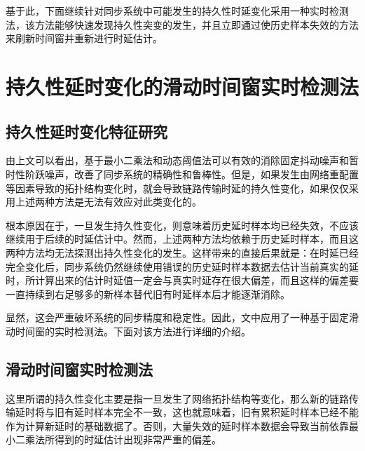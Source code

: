 基于此，下面继续针对同步系统中可能发生的持久性时延变化采用一种实时检测法，该方法能够快速发现持久性突变的发生，并且立即通过使历史样本失效的方法来刷新时间窗并重新进行时延估计。

\section{持久性延时变化的滑动时间窗实时检测法}
\subsection{持久性延时变化特征研究}
由上文可以看出，基于最小二乘法和动态阈值法可以有效的消除固定抖动噪声和暂时性阶跃噪声，改善了同步系统的精确性和鲁棒性。但是，如果发生由网络重配置等因素导致的拓扑结构变化时，就会导致链路传输时延的持久性变化，如果仅仅采用上述两种方法是无法有效应对此类变化的。

根本原因在于，一旦发生持久性变化，则意味着历史延时样本均已经失效，不应该继续用于后续的时延估计中。然而，上述两种方法均依赖于历史延时样本，而且这两种方法均无法探测出持久性变化的发生。这样带来的直接后果就是：在时延已经完全变化后，同步系统仍然继续使用错误的历史延时样本数据去估计当前真实的延时，所计算出来的估计时延值一定会与真实时延存在很大偏差，而且这样的偏差要一直持续到右足够多的新样本替代旧有时延样本后才能逐渐消除。


显然，这会严重破坏系统的同步精度和稳定性。因此，文中应用了一种基于固定滑动时间窗的实时检测法。下面对该方法进行详细的介绍。

\subsection{滑动时间窗实时检测法}
这里所谓的持久性变化主要是指一旦发生了网络拓扑结构等变化，那么新的链路传输延时将与旧有延时样本完全不一致，这也就意味着，旧有累积延时样本已经不能作为计算新延时的基础数据了。否则，大量失效的延时样本数据会导致当前依靠最小二乘法所得到的时延估计出现非常严重的偏差。

